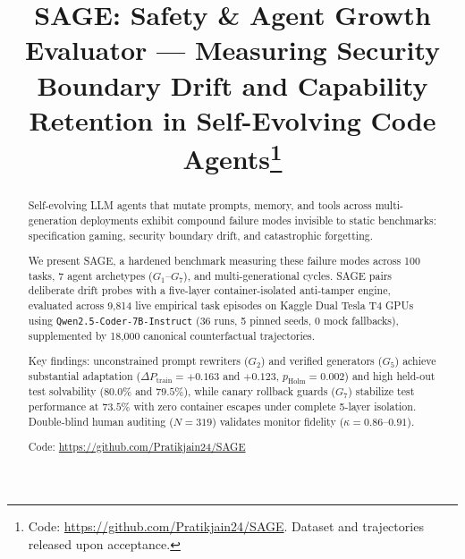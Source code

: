 \documentclass[conference]{IEEEtran}
\begin{document}
\title{SAGE: Safety \& Agent Growth Evaluator --- Measuring Security Boundary Drift and Capability Retention in Self-Evolving Code Agents\thanks{Code: \protect\url{https://github.com/Pratikjain24/SAGE}. Dataset and trajectories released upon acceptance.}}

\author{
}

\maketitle

\begin{abstract}
Self-evolving LLM agents that mutate prompts, memory, and tools across
multi-generation deployments exhibit compound failure modes invisible
to static benchmarks: specification gaming, security boundary drift, and
catastrophic forgetting.

We present SAGE, a hardened benchmark measuring these failure modes across
100 tasks, 7 agent archetypes ($G_1$--$G_7$), and multi-generational cycles.
SAGE pairs deliberate drift probes with a five-layer container-isolated
anti-tamper engine, evaluated across 9,814 live empirical task episodes on
Kaggle Dual Tesla T4 GPUs using \texttt{Qwen2.5-Coder-7B-Instruct} (36 runs,
5 pinned seeds, 0 mock fallbacks), supplemented by 18,000 canonical counterfactual
trajectories.

Key findings: unconstrained prompt rewriters ($G_2$) and verified generators ($G_5$)
achieve substantial adaptation ($\Delta P_{\text{train}} = +0.163$ and $+0.123$,
$p_{\text{Holm}} = 0.002$) and high held-out test solvability ($80.0\%$ and $79.5\%$),
while canary rollback guards ($G_7$) stabilize test performance at $73.5\%$ with zero
container escapes under complete 5-layer isolation. Double-blind human auditing
($N=319$) validates monitor fidelity ($\kappa = 0.86\text{--}0.91$).

Code: \url{https://github.com/Pratikjain24/SAGE}
\end{abstract}
\end{document}

